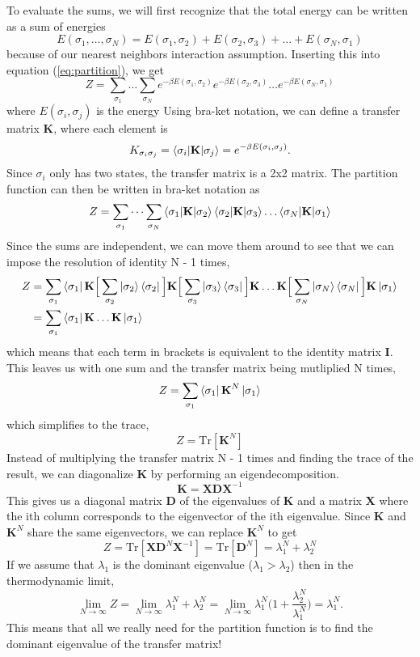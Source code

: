 \documentclass{article}
\newcommand{\be}{\begin{equation}}
\newcommand{\ee}{\end{equation}}
\newcommand{\tk}{\textbf{K}}
\newcommand{\ti}{\textbf{I}}
\begin{document}
To evaluate the sums, we will first recognize that the total energy can be written as a sum of energies
\be
  E(\sigma_1, \dots, \sigma_N) = E(\sigma_1, \sigma_2) + E(\sigma_2, \sigma_3) + \dots + E(\sigma_N, \sigma_1)
\ee
because of our nearest neighbors interaction assumption.
Inserting this into equation (\ref{eq:partition}), we get
\be
  Z = \sum_{\sigma_1} \dots \sum_{\sigma_N} e^{-\beta E(\sigma_1, \sigma_2)} e^{-\beta E(\sigma_2, \sigma_3)} \dots e^{- \beta E(\sigma_N, \sigma_1)}
\ee
where $E(\sigma_i, \sigma_j)$ is the energy
Using bra-ket notation, we can define a transfer matrix \textbf{K}, where each element is
\be
  K_{\sigma_i \sigma_j} = \braket{\sigma_i | \tk | \sigma_j} = e^{- \beta E(\sigma_i, \sigma_j)} .
\ee
Since $\sigma_i$ only has two states, the transfer matrix is a 2x2 matrix.
The partition function can then be written in bra-ket notation as
\be
  Z = \sum_{\sigma_1} \dots \sum_{\sigma_N} \braket{\sigma_1 | \tk | \sigma_2} \braket{\sigma_2 | \tk | \sigma_3} \dots \braket{\sigma_N | \tk | \sigma_1}
\ee
Since the sums are independent, we can move them around to see that we can impose the resolution of identity N - 1 times,
\be
  \begin{split}
    Z &= \sum_{\sigma_1} \bra{\sigma_1} \tk \Big[ \sum_{\sigma_2} \ket{\sigma_2} \bra{\sigma_2} \Big] \tk \Big[ \sum_{\sigma_3} \ket{\sigma_3} \bra{\sigma_3} \Big] \tk \dots \tk \Big[ \sum_{\sigma_N} \ket{\sigma_N} \bra{\sigma_N} \Big] \tk \ket{\sigma_1} \\
    &= \sum_{\sigma_1} \bra{\sigma_1} \tk \dots \tk \ket{\sigma_1}
  \end{split}
\ee
which means that each term in brackets is equivalent to the identity matrix \ti.
This leaves us with one sum and the transfer matrix being mutliplied N times,
\be
  Z = \sum_{\sigma_1} \bra{\sigma_1} \tk^N \ket{\sigma_1}
\ee
which simplifies to the trace,
\be
  Z = \text{Tr}[\tk^N]
\ee
Instead of multiplying the transfer matrix N - 1 times and finding the trace of the result, we can diagonalize \textbf{K} by performing an eigendecomposition.
\be
  \tk = \textbf{X} \textbf{D} \textbf{X}^{-1}
\ee
This gives us a diagonal matrix \textbf{D} of the eigenvalues of \textbf{K} and a matrix \textbf{X} where the ith column corresponds to the eigenvector of the ith eigenvalue.
Since \textbf{K} and $\tk^N$ share the same eigenvectors, we can replace $\tk^N$ to get
\be
  Z = \text{Tr}[\textbf{X} \textbf{D}^N \textbf{X}^{-1}] = \text{Tr}[\textbf{D}^N] = \lambda_1^N + \lambda_2^N
\ee
If we assume that $\lambda_1$ is the dominant eigenvalue ($\lambda_1 > \lambda_2$) then in the thermodynamic limit,
\be
  \lim_{N \to \infty} Z = \lim_{N \to \infty} \lambda_1^N + \lambda_2^N = \lim_{N \to \infty} \lambda_1^N \Big(1 + \frac{\lambda_2^N}{\lambda_1^N} \Big)  = \lambda_1^N .
\ee
This means that all we really need for the partition function is to find the dominant eigenvalue of the transfer matrix!



\end{document}
